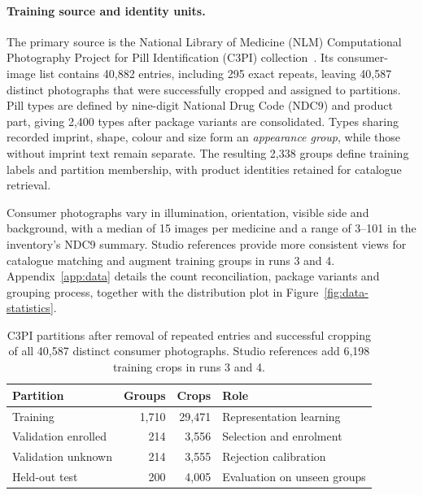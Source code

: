 \paragraph{Training source and identity units.}
The primary source is the National Library of Medicine (NLM) Computational Photography Project for Pill Identification (C3PI) collection~\citep{yaniv2016nlm}. Its consumer-image list contains 40,882 entries, including 295 exact repeats, leaving 40,587 distinct photographs that were successfully cropped and assigned to partitions. Pill types are defined by nine-digit National Drug Code (NDC9) and product part, giving 2,400 types after package variants are consolidated. Types sharing recorded imprint, shape, colour and size form an \emph{appearance group}, while those without imprint text remain separate. The resulting 2,338 groups define training labels and partition membership, with product identities retained for catalogue retrieval.

Consumer photographs vary in illumination, orientation, visible side and background, with a median of 15 images per medicine and a range of 3--101 in the inventory's NDC9 summary. Studio references provide more consistent views for catalogue matching and augment training groups in runs 3 and 4. Appendix~\ref{app:data} details the count reconciliation, package variants and grouping process, together with the distribution plot in Figure~\ref{fig:data-statistics}.

\begin{table}[!htbp]
\centering\small
\caption{C3PI partitions after removal of repeated entries and successful cropping of all 40,587 distinct consumer photographs. Studio references add 6,198 training crops in runs 3 and 4.}
\label{tab:data}
\begin{tabular}{@{}lrrl@{}}
\toprule
Partition & Groups & Crops & Role \\
\midrule
Training & 1,710 & 29,471 & Representation learning \\
Validation enrolled & 214 & 3,556 & Selection and enrolment \\
Validation unknown & 214 & 3,555 & Rejection calibration \\
Held-out test & 200 & 4,005 & Evaluation on unseen groups \\
\bottomrule
\end{tabular}
\end{table}

